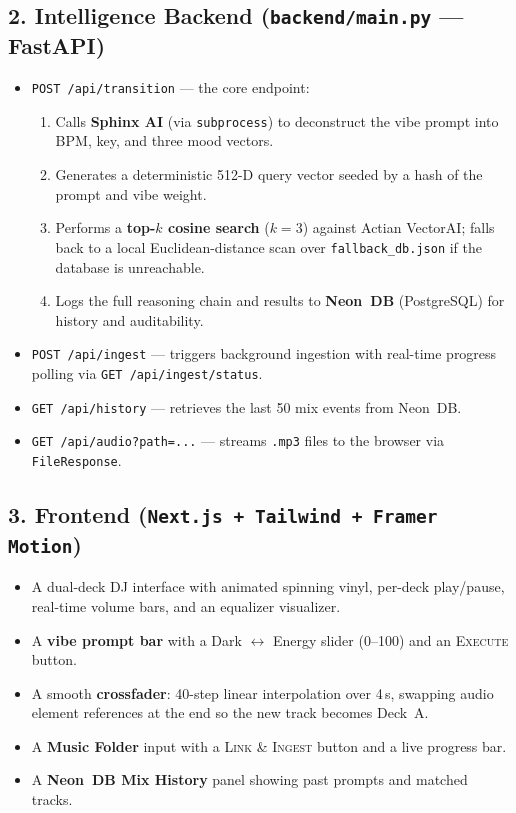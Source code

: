 \documentclass[11pt,a4paper]{article}
\begin{document}
\subsection{2. Intelligence Backend (\texttt{backend/main.py} --- FastAPI)}
\begin{itemize}[leftmargin=1.5em]
  \item \texttt{POST /api/transition} --- the core endpoint:
        \begin{enumerate}
          \item Calls \textbf{Sphinx AI} (via \texttt{subprocess}) to deconstruct the vibe prompt into BPM, key, and three mood vectors.
          \item Generates a deterministic 512-D query vector seeded by a hash of the prompt and vibe weight.
          \item Performs a \textbf{top-$k$ cosine search} ($k{=}3$) against Actian VectorAI; falls back to a local Euclidean-distance scan over \texttt{fallback\_db.json} if the database is unreachable.
          \item Logs the full reasoning chain and results to \textbf{Neon~DB} (PostgreSQL) for history and auditability.
        \end{enumerate}
  \item \texttt{POST /api/ingest} --- triggers background ingestion with real-time progress polling via \texttt{GET /api/ingest/status}.
  \item \texttt{GET /api/history} --- retrieves the last 50 mix events from Neon~DB.
  \item \texttt{GET /api/audio?path=...} --- streams \texttt{.mp3} files to the browser via \texttt{FileResponse}.
\end{itemize}

\subsection{3. Frontend (\texttt{Next.js + Tailwind + Framer Motion})}
\begin{itemize}[leftmargin=1.5em]
  \item A dual-deck DJ interface with animated spinning vinyl, per-deck play/pause, real-time volume bars, and an equalizer visualizer.
  \item A \textbf{vibe prompt bar} with a Dark $\leftrightarrow$ Energy slider (0--100) and an \textsc{Execute} button.
  \item A smooth \textbf{crossfader}: 40-step linear interpolation over 4\,s, swapping audio element references at the end so the new track becomes Deck~A.
  \item A \textbf{Music Folder} input with a \textsc{Link \& Ingest} button and a live progress bar.
  \item A \textbf{Neon~DB Mix History} panel showing past prompts and matched tracks.
\end{itemize}
\end{document}

